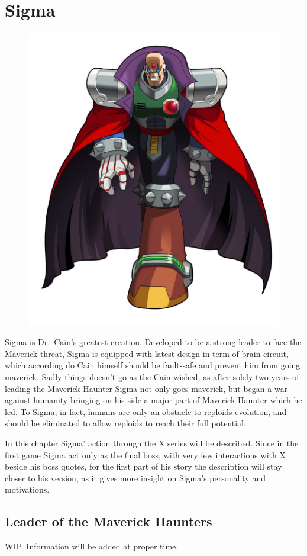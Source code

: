 \chapter{Sigma}\label{char:Sigma}
\begin{figure}[h]
	\centering
	\includegraphics[width=0.4\linewidth]{figures/X1/Sigma_stages/MHXSigma.jpg}
\end{figure}
Sigma is Dr.~Cain's greatest creation. Developed to be a strong leader to face the Maverick threat, Sigma is equipped with latest design in term of brain circuit, which according do Cain himself should be fault-safe and prevent him from going maverick. Sadly things doesn't go as the Cain wished, as after solely two years of leading the Maverick Haunter Sigma not only goes maverick, but began a war against humanity bringing on his side a major part of Maverick Haunter which he led. To Sigma, in fact, humans are only an obstacle to reploids evolution, and should be eliminated to allow reploids to reach their full potential. 

In this chapter Sigma' action through the X series will be described. Since in the first game Sigma act only as the final boss, with very few interactions with X beside his boss quotes, for the first part of his story the description will stay closer to his \mhx version, as it gives more insight on Sigma's personality and motivations.

\section{Leader of the Maverick Haunters}
WIP. Information will be added at proper time.


